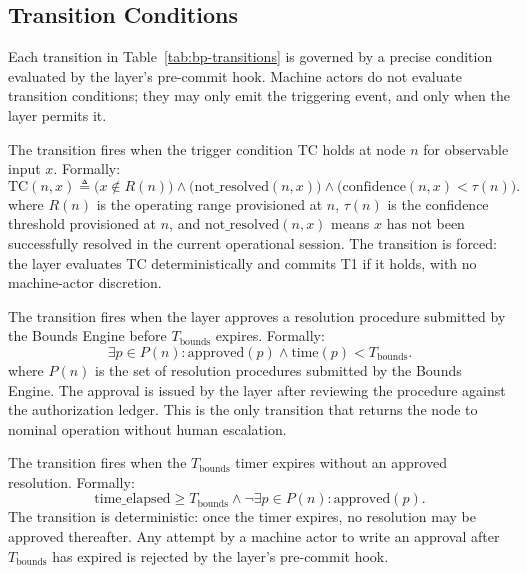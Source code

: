 \subsection{Transition Conditions}
\label{sec:transition-conditions}

Each transition in Table~\ref{tab:bp-transitions} is governed by a precise condition evaluated by the \fact{} layer's pre-commit hook. Machine actors do not evaluate transition conditions; they may only emit the triggering event, and only when the \fact{} layer permits it.

\begin{description}\itemsep=0pt
\item[T1 --- IDLE to BOUNDED] The transition fires when the trigger condition TC holds at node $n$ for observable input $x$. Formally:
\[
\text{TC}(n, x) \triangleq \big(x \notin R(n)\big) \land \big(\text{not\_resolved}(n, x)\big) \land \big(\text{confidence}(n, x) < \tau(n)\big).
\]
where $R(n)$ is the operating range provisioned at $n$, $\tau(n)$ is the confidence threshold provisioned at $n$, and $\text{not\_resolved}(n, x)$ means $x$ has not been successfully resolved in the current operational session. The transition is forced: the \fact{} layer evaluates TC deterministically and commits T1 if it holds, with no machine-actor discretion.

\item[T2 --- BOUNDED to IDLE] The transition fires when the \fact{} layer approves a resolution procedure submitted by the Bounds Engine before $T_{\text{bounds}}$ expires. Formally:
\[
\exists p \in P(n) : \text{approved}(p) \land \text{time}(p) < T_{\text{bounds}}.
\]
where $P(n)$ is the set of resolution procedures submitted by the Bounds Engine. The approval is issued by the \fact{} layer after reviewing the procedure against the authorization ledger. This is the only transition that returns the node to nominal operation without human escalation.

\item[T3 --- BOUNDED to BAIL\_PENDING] The transition fires when the $T_{\text{bounds}}$ timer expires without an approved resolution. Formally:
\[
\text{time\_elapsed} \geq T_{\text{bounds}} \land \neg\exists p \in P(n) : \text{approved}(p).
\]
The transition is deterministic: once the timer expires, no resolution may be approved thereafter. Any attempt by a machine actor to write an approval after $T_{\text{bounds}}$ has expired is rejected by the \fact{} layer's pre-commit hook.


\end{description}
